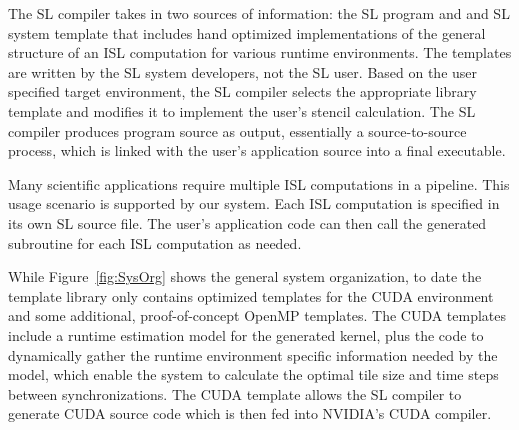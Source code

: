 \documentclass{sig-alternate}
\begin{document}
The SL compiler takes in two sources of information: the SL program and and
SL system template that includes hand optimized implementations of the
general structure of an ISL computation for various runtime environments.
The templates are written by the SL system developers, not the SL user.
Based on the user specified target environment, the SL compiler selects the
appropriate library template and modifies it to implement the user's stencil
calculation.  The SL compiler produces program source as output, essentially a
source-to-source process, which is linked with the user's application source
into a final executable.

Many scientific applications require multiple ISL computations in a pipeline.
This usage scenario is supported by our system.  Each ISL computation is
specified in its own SL source file.  The user's application code can then
call the generated subroutine for each ISL computation as needed.

While Figure~\ref{fig:SysOrg} shows the general system organization, to date
the template library only contains optimized templates for the CU\-DA
environment and some additional, proof-of-concept OpenMP templates.  The CUDA
templates include a runtime estimation mod\-el for the generated kernel, plus
the code to dynamically gather the runtime environment specific information
needed by the model, which enable the system to calculate the optimal tile
size and time steps between synchronizations.  The CUDA template allows the
SL compiler to generate CUDA source code which is then fed into NVIDIA's CUDA
compiler.
\end{document}

